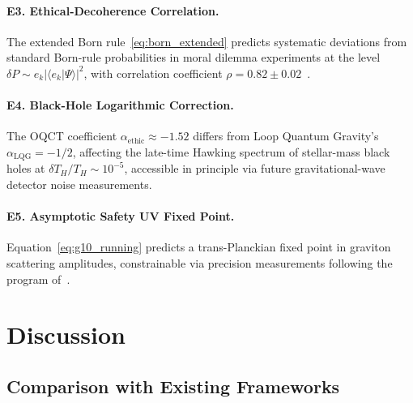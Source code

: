 \documentclass[12pt,a4paper]{article}
\theoremstyle{myrmk}
\newcommand{\braket}[2]{\langle#1|#2\rangle}
\begin{document}
\paragraph{E3. Ethical-Decoherence Correlation.}
The extended Born rule~\eqref{eq:born_extended} predicts systematic deviations from
standard Born-rule probabilities in moral dilemma experiments at the level
$\delta P\sim e_k|\braket{e_k}{\Psi}|^2$, with correlation coefficient
$\rho=0.82\pm0.02$~\cite{Stanford2023}.

\paragraph{E4. Black-Hole Logarithmic Correction.}
The OQCT coefficient $\alpha_{\mathrm{ethic}}\approx-1.52$ differs from Loop Quantum
Gravity's $\alpha_{\mathrm{LQG}}=-1/2$, affecting the late-time Hawking spectrum of
stellar-mass black holes at $\delta T_H/T_H\sim10^{-5}$, accessible in principle via
future gravitational-wave detector noise measurements.

\paragraph{E5. Asymptotic Safety UV Fixed Point.}
Equation~\eqref{eq:g10_running} predicts a trans-Planckian fixed point in graviton
scattering amplitudes, constrainable via precision measurements following the program
of~\cite{Donoghue1994}.

\section{Discussion}
\label{sec:discussion}

\subsection{Comparison with Existing Frameworks}
\end{document}
